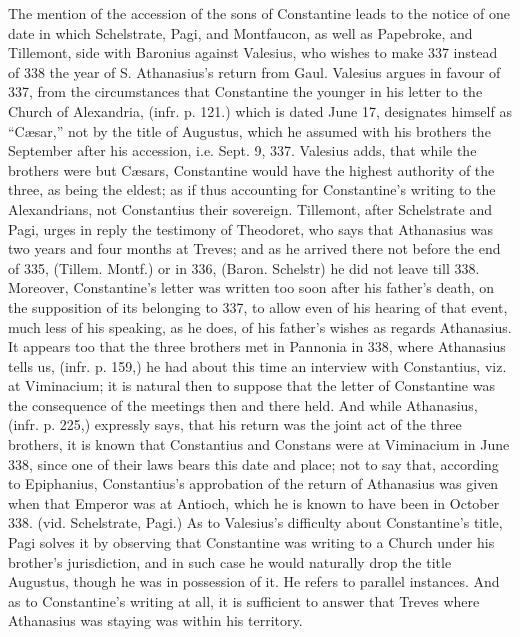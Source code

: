 The mention of the accession
of the sons of Constantine leads to the notice of one date in which
Schelstrate, Pagi, and Montfaucon, as well as Papebroke, and Tillemont,
side with Baronius against Valesius, who wishes to make 337 instead of
338 the year of S. Athanasius's return from Gaul. Valesius argues in
favour of 337, from the circumstances that Constantine the younger in
his letter to the Church of Alexandria, (infr. p. 121.) which is dated
June 17, designates himself as “Cæsar,” not by the title of
Augustus, which he assumed with his brothers the September after his
accession, i.e. Sept. 9, 337. Valesius adds, that while the brothers
were but Cæsars, Constantine would have the highest authority of the
three, as being the eldest; as if thus accounting for Constantine's
writing to the Alexandrians, not Constantius their sovereign.
Tillemont, after Schelstrate and Pagi, urges in reply the testimony of
Theodoret, who says that Athanasius was two years and four months at
Treves; and as he arrived there not before the end of 335, (Tillem.
Montf.) or in 336, (Baron. Schelstr) he did not leave till 338.
Moreover, Constantine's letter was written too soon after his father's
death, on the supposition of its belonging to 337, to allow even of
his hearing of that event, much less of his speaking, as he
does, of his father's wishes as regards Athanasius. It appears too
that the three brothers met in Pannonia in 338, where Athanasius tells
us, (infr. p. 159,) he had about this time an interview with
Constantius, viz. at Viminacium; it is natural then to suppose that
the letter of Constantine was the consequence of the meetings then and
there held. And while Athanasius, (infr. p. 225,) expressly says, that
his return was the joint act of the three brothers, it is known that
Constantius and Constans were at Viminacium in June 338, since one of
their laws bears this date and place; not to say that, according to
Epiphanius, Constantius's approbation of the return of Athanasius was
given when that Emperor was at Antioch, which he is known to have been
in October 338. (vid. Schelstrate, Pagi.) As to Valesius's difficulty
about Constantine's title, Pagi solves it by observing that
Constantine was writing to a Church under his brother's jurisdiction,
and in such case he would naturally drop the title Augustus, though he
was in possession of it. He refers to parallel instances. And as to
Constantine's writing at all, it is sufficient to answer that Treves
where Athanasius was staying was within his territory.

